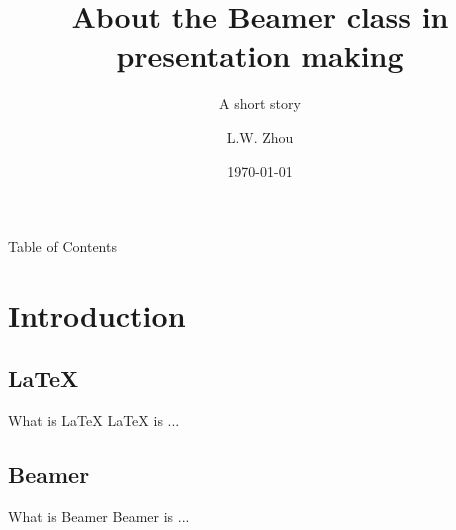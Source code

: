 \documentclass{beamer}
\title[About Beamer]{About the Beamer class in presentation making}
\subtitle{A short story}
\author{L.W. Zhou}
\date{\today}
\begin{document}
\begin{frame}{}
\titlepage
\end{frame}

\begin{frame}{Table of Contents}
  \tableofcontents
\end{frame}

\section{Introduction}
\subsection{LaTeX}
\begin{frame}{What is LaTeX}
LaTeX is ...
\end{frame}


\subsection{Beamer}
\begin{frame}{What is Beamer}
Beamer is ...
\end{frame}
\end{document}
